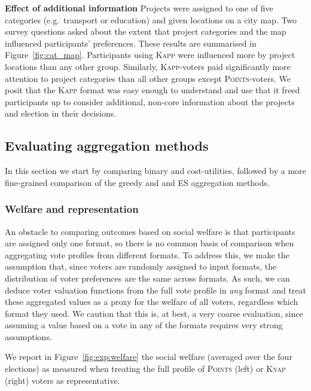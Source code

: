 \documentclass[mnsc,blindrev]{informs3_freeuse} %
\newcommand{\points}{\textsc{Points}}
\newcommand{\knap}{\textsc{Knap}}
\newcommand{\kapp}{\textsc{Kapp}}
\begin{document}
\textbf{Effect of additional information}
Projects were assigned to one of five categories (e.g.\ transport or education) and given locations on a city map. Two survey questions asked about the extent that project categories and the map influenced participants' preferences. These results are summarised in Figure~\ref{fig:cat_map}.
%
Participants using \kapp{} were influenced  more by project locations than any other group. Similarly, \kapp-voters paid significantly more attention to project categories than all other groups except \points-voters. 
We posit  that the \kapp{} format was easy enough to understand and use that it freed participants up to consider additional, non-core information about the projects and   election in their decisions. 


\subsection{Evaluating aggregation methods}
\label{sec:aggregation}

In this section we   start by comparing binary and cost-utilities, followed by a more fine-grained comparison of the greedy and and ES aggregation methods. 

\subsubsection{Welfare and representation}
An obstacle to comparing outcomes based on social welfare is that participants are assigned only one format, so there is no common basis of comparison when aggregating vote profiles from different formats. To address this, we make the assumption that, since voters are randomly assigned to input formats, the distribution of voter preferences are the same across formats. As such, we can deduce voter valuation functions from the full vote profile in \emph{any} format and treat these aggregated values as a proxy for the welfare of all voters, regardless which format they used.  We caution that this is, at best, a very coarse evaluation, since assuming a value based on  a vote in any of the formats requires very strong assumptions.  

We report in Figure~\ref{fig:exp:welfare} the   social welfare (averaged over the four elections) as measured when treating the full profile of \points{} (left) or \knap{} (right) voters as representative.  
\end{document}
